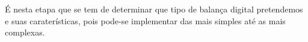 É nesta etapa que se tem de determinar que tipo de balança digital pretendemos e suas caraterísticas, pois pode-se implementar das mais simples até as mais complexas.
\begin{comment}
Measurement devices need to be robust to withstand changing environmental influences such as temperature, vibration, and humidity, and they must also provide reliable measurement over long periods of time. Mechanical interfacing of the devices can be difficult and can influence final measurement. The forces and torques may change rapidly, and so the devices must have adequate frequency and transient responses.\\
There are several methods to measure forces and torques. Often, the force to be measured is converted into a change in length of a spring element. The change in dimensions is subsequently measured by a sensor, for example, a piezoresistive, a capacitive or a resonant sensor.\\
It is not so surprising, therefore, that most force and torque measurement devices utilize the long and well-established resistance strain gauge technology.\\
Unfortunately, the metallic resistance strain gauge is relatively insensitive such that in use it is normal to obtain only several millivolts of analog voltage before amplification, and the gauges must not be significantly overstrained. The rangeability and overloading capabilities are seriously restricted. Also, the gauges consume relatively high electrical power (e.g., 250 mW).\\
In general, measurement instrumentation now needs smaller sensing devices of lower power consumption and with greater rangeability and overload capabilities.\\
Greater compatibility with digital microelectronics is highly desirable. Noncontact and wireless operation is sometimes needed, and in some cases batteryless devices are desirable. Production of measurement devices using metallic resistance strain gauges can be relatively labor intensive and skilled, and may require relatively ineffi-cient calibration procedures.\\
In recent years some instrument manufacturers of force and torque measure-ment devices have moved away from using resistance strain gauges. Already, one leading manufacturer of weighing machines for retail and industrial applications now uses metallic and quartz resonant tuning fork technologies, and smaller companies have established niche markets using surface acoustic wave (SAW) technology, optical technology, and magnetoelastic technology.\\

\end{comment}
